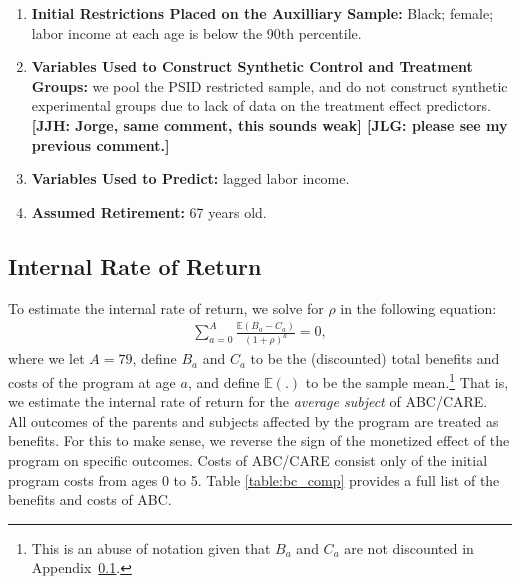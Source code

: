 \begin{enumerate}
\begin{enumerate}
\item \textbf{Initial Restrictions Placed on the Auxilliary Sample:} Black; female; labor income at each age is below the 90th percentile.
\item \textbf{Variables Used to Construct Synthetic Control and Treatment Groups:} we pool the PSID restricted sample, and do not construct synthetic experimental groups due to lack of data on the treatment effect predictors. \textbf{[JJH: Jorge, same comment, this sounds weak] [JLG: please see my previous comment.]}
\item \textbf{Variables Used to Predict:} lagged labor income.
\item \textbf{Assumed Retirement:} 67 years old.
\end{enumerate}
\end{enumerate}

\subsection{Internal Rate of Return}
\label{app:method_irr}

\noindent To estimate the internal rate of return, we solve for $\rho$ in the following equation:
\begin{align}
\sum_{a=0}^A \frac{ \mathbb{E} (B_a - C_a)}{(1+\rho)^a} = 0,
\end{align}
where we let $A = 79$, define $B_a$ and $C_a$ to be the (discounted) total benefits and costs of the program at age $a$, and define $\mathbb{E}(.)$ to be the sample mean.\footnote{This is an abuse of notation given that $B_a$ and $C_a$ are not discounted in Appendix~\ref{app:method_irr}.} That is, we estimate the internal rate of return for the \textit{average subject} of ABC/CARE. \\

\noindent All outcomes of the parents and subjects affected by the program are treated as benefits. For this to make sense, we reverse the sign of the monetized effect of the program on specific outcomes. Costs of ABC/CARE consist only of the initial program costs from ages 0 to 5. Table \ref{table:bc_comp} provides a full list of the benefits and costs of ABC. \\

